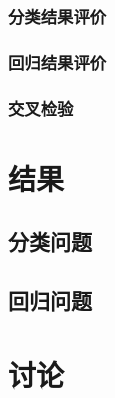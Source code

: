 \documentclass[UTF8]{ctexart}
\begin{document}
  \subsubsection{分类结果评价}
  \subsubsection{回归结果评价}
  \subsubsection{交叉检验}

  \section{结果}
  \subsection{分类问题}
  \subsection{回归问题}

  \section{讨论}
 
  \printbibliography
\end{document}
